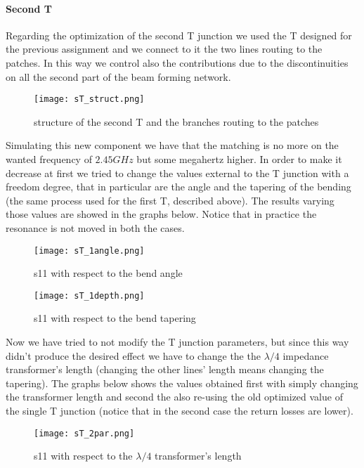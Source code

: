 \paragraph{Second T}
Regarding the optimization of the second T junction we used the T designed for the previous assignment and we connect to it the two lines routing to the patches. In this way we control also the contributions due to the discontinuities on all the second part of the beam forming network.
\begin{figure}[H]
	\centering
	\texttt{[image: sT\_struct.png]}
	\caption{structure of the second T and the branches routing to the patches}
	\label{sT_struct}
\end{figure}
Simulating this new component we have that the matching is no more on the wanted frequency of $2.45GHz$ but some megahertz higher. In order to make it decrease at first we tried to change the values external to the T junction with a freedom degree, that in particular are the angle and the tapering of the bending (the same process used for the first T, described above). The results varying those values are showed in the graphs below. Notice that in practice the resonance is not moved in both the cases.
\begin{figure}[H]
	\centering
	\texttt{[image: sT\_1angle.png]}
	\caption{s11 with respect to the bend angle}
	\label{sT_1angle}
\end{figure}
\begin{figure}[H]
	\centering
	\texttt{[image: sT\_1depth.png]}
	\caption{s11 with respect to the bend tapering}
	\label{sT_1depth}
\end{figure}
Now we have tried to not modify the T junction parameters, but since this way didn't produce the desired effect we have to change the the $\lambda/4$ impedance transformer's length (changing the other lines' length means changing the tapering). The graphs below shows the values obtained first with simply changing the transformer length and second the also re-using the old optimized value of the single T junction (notice that in the second case the return losses are lower).
\begin{figure}[H]
	\centering
	\texttt{[image: sT\_2par.png]}
	\caption{s11 with respect to the $\lambda/4$ transformer's length}
	\label{sT_2par}
\end{figure}
